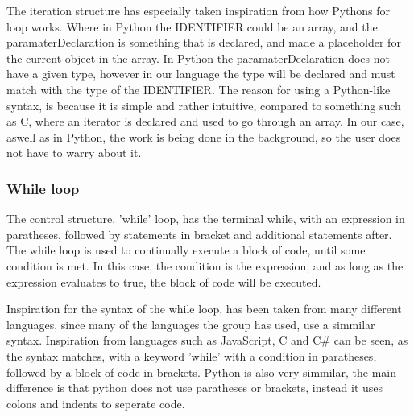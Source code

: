 The iteration structure has especially taken inspiration from how Pythons for loop works. Where in Python the IDENTIFIER could be an array, and the paramaterDeclaration is something that is declared, and made a placeholder for the current object in the array. In Python the paramaterDeclaration does not have a given type, however in our language the type will be declared and must match with the type of the IDENTIFIER. The reason for using a Python-like syntax, is because it is simple and rather intuitive, compared to something such as C, where an iterator is declared and used to go through an array. In our case, aswell as in Python, the work is being done in the background, so the user does not have to warry about it.


\subsubsection{While loop}
The control structure,  'while' loop, has the terminal while, with an expression in paratheses, followed by statements in bracket and additional statements after.
The while loop is used to continually execute a block of code, until some condition is met. In this case, the condition is the expression, and as long as the expression evaluates to true, the block of code will be executed.

Inspiration for the syntax of the while loop, has been taken from many different languages, since many of the languages the group has used, use a simmilar syntax. Inspiration from languages such as JavaScript, C and C\# can be seen, as the syntax matches, with a keyword 'while' with a condition in paratheses, followed by a block of code in brackets. Python is also very simmilar, the main difference is that python does not use paratheses or brackets, instead it uses colons and indents to seperate code.

